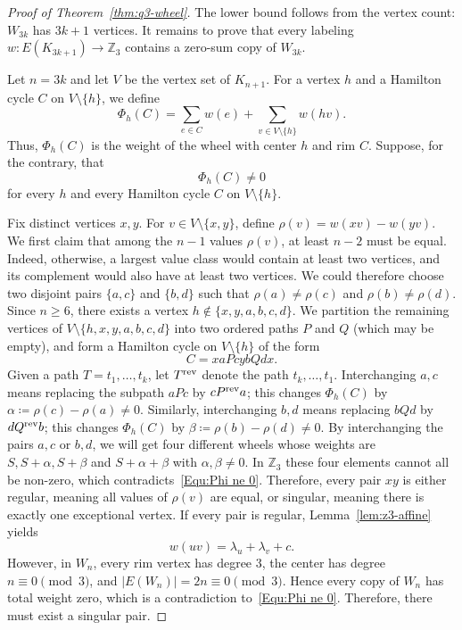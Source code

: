 \documentclass[11pt]{article}
\theoremstyle{remark}
\newcommand{\Z}{\mathbb Z}
\begin{document}
\begin{proof}[Proof of Theorem~\ref{thm:q3-wheel}]
    The lower bound follows from the vertex count: $W_{3k}$ has $3k+1$ vertices.
    It remains to prove that every labeling $w\colon E(K_{3k+1})\to\Z_3$ contains a zero-sum copy of $W_{3k}$.

    Let $n=3k$ and let $V$ be the vertex set of $K_{n+1}$.
    For a vertex $h$ and a Hamilton cycle $C$ on $V\setminus\{h\}$, we define
    \[
        \Phi_h(C)=\sum_{e\in C}w(e)+\sum_{v\in V\setminus\{h\}}w(hv).
    \]
    Thus, $\Phi_h(C)$ is the weight of the wheel with center $h$ and rim $C$.  Suppose, for the contrary, that
    \begin{equation}\label{Equ:Phi ne 0}
        \Phi_h(C)\ne0
    \end{equation}
    for every $h$ and every Hamilton cycle $C$ on $V\setminus\{h\}$.

    Fix distinct vertices $x,y$.
    For $v\in V\setminus\{x,y\}$, define $\rho(v)=w(xv)-w(yv)$.
    We first claim that among the $n-1$ values $\rho(v)$, at least $n-2$ must be equal.  Indeed, otherwise, a largest value class would contain at least two vertices, and its complement would also have at least two vertices.
    We could therefore choose two disjoint pairs $\{a,c\}$ and $\{b,d\}$ such that $\rho(a)\ne\rho(c)$ and $\rho(b)\ne\rho(d)$.
    Since $n\ge6$, there exists a vertex $h\notin\{x,y,a,b,c,d\}$.
    We partition the remaining vertices of $V\setminus\{h,x,y,a,b,c,d\}$ into two ordered paths $P$ and $Q$ (which may be empty), and form a Hamilton cycle on $V\setminus\{h\}$ of the form
    \[
        C=xaPcybQdx.
    \]
    Given a path $T=t_1,\ldots,t_k$, let $T^{\rm rev}$ denote the path $t_k,\ldots,t_1$.
    Interchanging $a,c$ means replacing the subpath $aPc$ by $cP^{\rm rev}a$; this changes $\Phi_h(C)$ by $\alpha\coloneqq\rho(c)-\rho(a)\ne0$.
    Similarly, interchanging $b,d$ means replacing $bQd$ by $dQ^{\rm rev}b$; this changes $\Phi_h(C)$ by $\beta\coloneqq\rho(b)-\rho(d)\ne0$.
    By interchanging the pairs $a,c$ or $b,d$, we will get four different wheels whose weights are $S,S+\alpha,S+\beta$ and $S+\alpha+\beta$ with $\alpha,\beta\ne0$.
    In $\Z_3$ these four elements cannot all be non-zero, which contradicts~\eqref{Equ:Phi ne 0}.
    Therefore, every pair $xy$ is either regular, meaning all values of $\rho(v)$ are equal, or singular, meaning there is exactly one exceptional vertex.
    If every pair is regular, Lemma~\ref{lem:z3-affine} yields
    \[
        w(uv)=\lambda_u+\lambda_v+c.
    \]
    However, in $W_n$, every rim vertex has degree $3$, the center has degree $n\equiv0\pmod3$, and $|E(W_n)|=2n\equiv0\pmod3$.
    Hence every copy of $W_n$ has total weight zero, which is a contradiction to~\eqref{Equ:Phi ne 0}.
    Therefore, there must exist a singular pair.


\end{proof}
\end{document}
